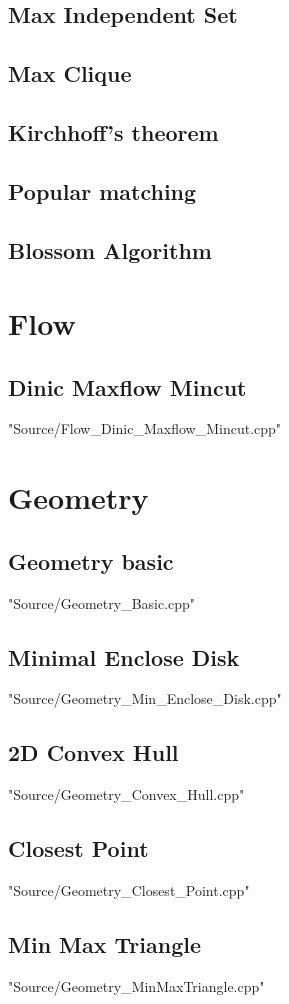\documentclass [10pt,twocolumn,oneside]{article}
\begin{document}
\subsection{Max Independent Set}


\subsection{Max Clique}


\subsection{Kirchhoff's theorem}


\subsection{Popular matching}


\subsection{Blossom Algorithm}





\section{Flow}
\subsection{Dinic Maxflow Mincut}
 {"Source/Flow_Dinic_Maxflow_Mincut.cpp"}





\section{Geometry}
\subsection{Geometry basic}
 {"Source/Geometry_Basic.cpp"}

\subsection{Minimal Enclose Disk}
 {"Source/Geometry_Min_Enclose_Disk.cpp"}

\subsection{2D Convex Hull}
 {"Source/Geometry_Convex_Hull.cpp"}

\subsection{Closest Point}
 {"Source/Geometry_Closest_Point.cpp"}

\subsection{Min Max Triangle}
 {"Source/Geometry_MinMaxTriangle.cpp"}
\end{document}
